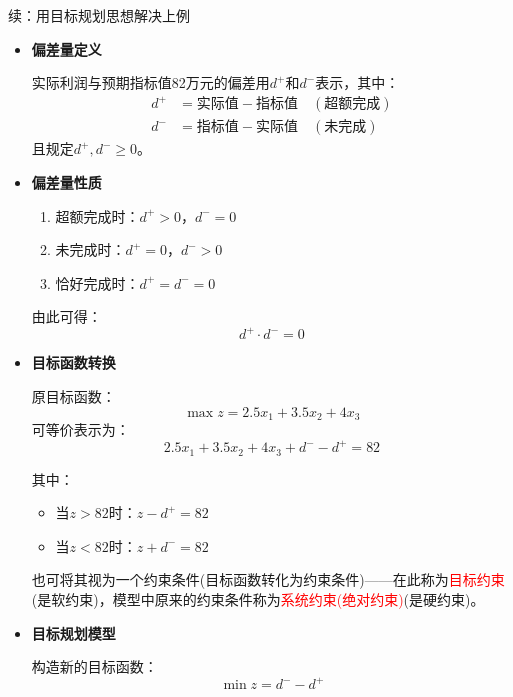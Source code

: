     \begin{exbox}{续：用目标规划思想解决上例}{}
    \begin{itemize}
        \item \textbf{偏差量定义}
        
        实际利润与预期指标值82万元的偏差用$d^+$和$d^-$表示，其中：
        \begin{align*}
            d^+ &= \text{实际值} - \text{指标值} \quad (\text{超额完成}) \\
            d^- &= \text{指标值} - \text{实际值} \quad (\text{未完成})
        \end{align*}
        且规定$d^+, d^- \geq 0$。
    
        \item \textbf{偏差量性质}
        \begin{enumerate}
            \item 超额完成时：$d^+ > 0$，$d^- = 0$
            \item 未完成时：$d^+ = 0$，$d^- > 0$
            \item 恰好完成时：$d^+ = d^- = 0$
        \end{enumerate}
        由此可得：
        \[ d^+ \cdot d^- = 0 \]
    
        \item \textbf{目标函数转换}
        
        原目标函数：
        \[ \max z = 2.5x_1 + 3.5x_2 + 4x_3 \]
        可等价表示为：
        \[ 2.5x_1 + 3.5x_2 + 4x_3 + d^- - d^+ = 82 \]
        
        其中：
        \begin{itemize}
            \item 当$z > 82$时：$z - d^+ = 82$
            \item 当$z < 82$时：$z + d^- = 82$
        \end{itemize}
        也可将其视为一个约束条件(目标函数转化为约束条件)——在此称为\textcolor{red}{目标约束}(是软约束)，模型中原来的约束条件称为\textcolor{red}{系统约束(绝对约束)}(是硬约束)。
    
        \item \textbf{目标规划模型}
        
        构造新的目标函数：
        \[ \min z = d^- - d^+ \]
        

\end{itemize}
\end{exbox}
